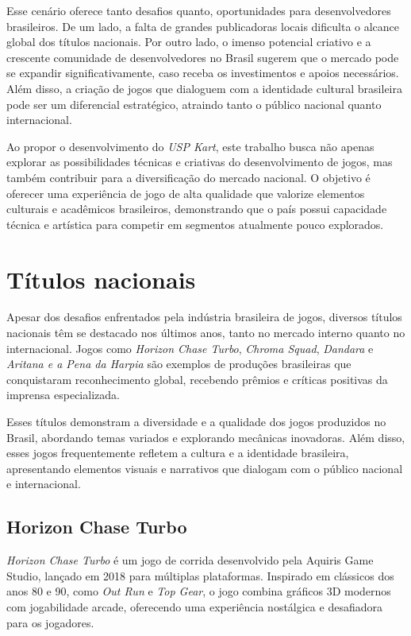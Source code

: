 Esse cenário oferece tanto desafios quanto, oportunidades para desenvolvedores brasileiros. De um lado, a falta de grandes publicadoras locais dificulta o alcance global dos títulos nacionais. Por outro lado, o imenso potencial criativo e a crescente comunidade de desenvolvedores no Brasil sugerem que o mercado pode se expandir significativamente, caso receba os investimentos e apoios necessários. Além disso, a criação de jogos que dialoguem com a identidade cultural brasileira pode ser um diferencial estratégico, atraindo tanto o público nacional quanto internacional.

Ao propor o desenvolvimento do \textit{USP Kart}, este trabalho busca não apenas explorar as possibilidades técnicas e criativas do desenvolvimento de jogos, mas também contribuir para a diversificação do mercado nacional. O objetivo é oferecer uma experiência de jogo de alta qualidade que valorize elementos culturais e acadêmicos brasileiros, demonstrando que o país possui capacidade técnica e artística para competir em segmentos atualmente pouco explorados.

\section{Títulos nacionais}
Apesar dos desafios enfrentados pela indústria brasileira de jogos, diversos títulos nacionais têm se destacado nos últimos anos, tanto no mercado interno quanto no internacional. Jogos como \textit{Horizon Chase Turbo}, \textit{Chroma Squad}, \textit{Dandara} e \textit{Aritana e a Pena da Harpia} são exemplos de produções brasileiras que conquistaram reconhecimento global, recebendo prêmios e críticas positivas da imprensa especializada.

Esses títulos demonstram a diversidade e a qualidade dos jogos produzidos no Brasil, abordando temas variados e explorando mecânicas inovadoras. Além disso, esses jogos frequentemente refletem a cultura e a identidade brasileira, apresentando elementos visuais e narrativos que dialogam com o público nacional e internacional.

\subsection{Horizon Chase Turbo}
\textit{Horizon Chase Turbo} é um jogo de corrida desenvolvido pela Aquiris Game Studio, lançado em 2018 para múltiplas plataformas. Inspirado em clássicos dos anos 80 e 90, como \textit{Out Run} e \textit{Top Gear}, o jogo combina gráficos 3D modernos com jogabilidade arcade, oferecendo uma experiência nostálgica e desafiadora para os jogadores.

